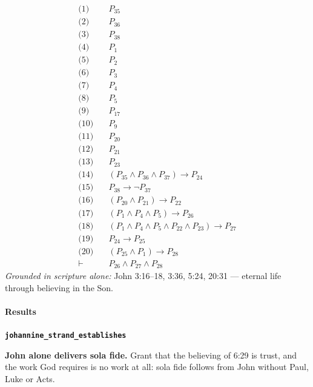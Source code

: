 \documentclass[11pt]{article}
\begin{document}
\begin{align*}
  \text{(1)} \quad & P_{35} \\
  \text{(2)} \quad & P_{36} \\
  \text{(3)} \quad & P_{38} \\
  \text{(4)} \quad & P_{1} \\
  \text{(5)} \quad & P_{2} \\
  \text{(6)} \quad & P_{3} \\
  \text{(7)} \quad & P_{4} \\
  \text{(8)} \quad & P_{5} \\
  \text{(9)} \quad & P_{17} \\
  \text{(10)} \quad & P_{9} \\
  \text{(11)} \quad & P_{20} \\
  \text{(12)} \quad & P_{21} \\
  \text{(13)} \quad & P_{23} \\
  \text{(14)} \quad & (P_{35} \land P_{36} \land P_{37}) \rightarrow P_{24} \\
  \text{(15)} \quad & P_{38} \rightarrow \lnot P_{37} \\
  \text{(16)} \quad & (P_{20} \land P_{21}) \rightarrow P_{22} \\
  \text{(17)} \quad & (P_{1} \land P_{4} \land P_{5}) \rightarrow P_{26} \\
  \text{(18)} \quad & (P_{1} \land P_{4} \land P_{5} \land P_{22} \land P_{23}) \rightarrow P_{27} \\
  \text{(19)} \quad & P_{24} \rightarrow P_{25} \\
  \text{(20)} \quad & (P_{25} \land P_{1}) \rightarrow P_{28} \\
  \vdash \quad & P_{26} \land P_{27} \land P_{28}
\end{align*}
\emph{Grounded in scripture alone:} John 3:16–18, 3:36, 5:24, 20:31 — eternal life through believing in the Son.
\paragraph*{Results}
\leavevmode\par
\par\medskip\noindent\textbf{\texttt{johannine\_\allowbreak{}strand\_\allowbreak{}establishes}}\par\nobreak\noindent
\textbf{John alone delivers sola fide.} Grant that the believing of 6:29 is trust, and the work God requires is no work at all: sola fide follows from John without Paul, Luke or Acts.
\end{document}
